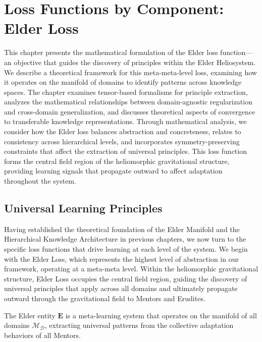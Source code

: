\chapter{Loss Functions by Component: Elder Loss}

\begin{tcolorbox}[colback=blue!5!white,colframe=blue!75!black,title=Chapter Summary]
This chapter presents the mathematical formulation of the Elder loss function—an objective that guides the discovery of principles within the Elder Heliosystem. We describe a theoretical framework for this meta-meta-level loss, examining how it operates on the manifold of domains to identify patterns across knowledge spaces. The chapter examines tensor-based formalisms for principle extraction, analyzes the mathematical relationships between domain-agnostic regularization and cross-domain generalization, and discusses theoretical aspects of convergence to transferable knowledge representations. Through mathematical analysis, we consider how the Elder loss balances abstraction and concreteness, relates to consistency across hierarchical levels, and incorporates symmetry-preserving constraints that affect the extraction of universal principles. This loss function forms the central field region of the heliomorphic gravitational structure, providing learning signals that propagate outward to affect adaptation throughout the system.
\end{tcolorbox}

\section{Universal Learning Principles}

Having established the theoretical foundation of the Elder Manifold and the Hierarchical Knowledge Architecture in previous chapters, we now turn to the specific loss functions that drive learning at each level of the system. We begin with the Elder Loss, which represents the highest level of abstraction in our framework, operating at a meta-meta level. Within the heliomorphic gravitational structure, Elder Loss occupies the central field region, guiding the discovery of universal principles that apply across all domains and ultimately propagate outward through the gravitational field to Mentors and Erudites.

\begin{definition}
The Elder entity $\textbf{E}$ is a meta-learning system that operates on the manifold of all domains $\mathcal{M}_{\mathcal{D}}$, extracting universal patterns from the collective adaptation behaviors of all Mentors.
\end{definition}

